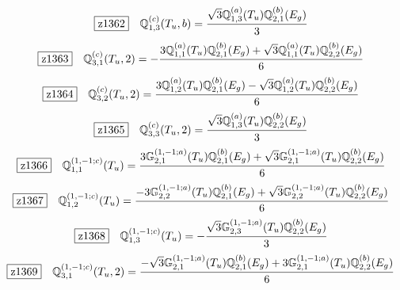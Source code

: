 \documentclass[fleqn,10pt,landscape]{jsarticle}
\begin{document}
\begin{dmath*}
\hspace*{3mm}\fbox{z1362}\quad \mathbb{Q}_{1,3}^{(c)}(T_{u},b)=\frac{\sqrt{3} \mathbb{Q}_{1,3}^{(a)}(T_{u}) \mathbb{Q}_{2,1}^{(b)}(E_{g})}{3}
\end{dmath*}
\begin{dmath*}
\hspace*{3mm}\fbox{z1363}\quad \mathbb{Q}_{3,1}^{(c)}(T_{u},2)=- \frac{3 \mathbb{Q}_{1,1}^{(a)}(T_{u}) \mathbb{Q}_{2,1}^{(b)}(E_{g}) + \sqrt{3} \mathbb{Q}_{1,1}^{(a)}(T_{u}) \mathbb{Q}_{2,2}^{(b)}(E_{g})}{6}
\end{dmath*}
\begin{dmath*}
\hspace*{3mm}\fbox{z1364}\quad \mathbb{Q}_{3,2}^{(c)}(T_{u},2)=\frac{3 \mathbb{Q}_{1,2}^{(a)}(T_{u}) \mathbb{Q}_{2,1}^{(b)}(E_{g}) - \sqrt{3} \mathbb{Q}_{1,2}^{(a)}(T_{u}) \mathbb{Q}_{2,2}^{(b)}(E_{g})}{6}
\end{dmath*}
\begin{dmath*}
\hspace*{3mm}\fbox{z1365}\quad \mathbb{Q}_{3,3}^{(c)}(T_{u},2)=\frac{\sqrt{3} \mathbb{Q}_{1,3}^{(a)}(T_{u}) \mathbb{Q}_{2,2}^{(b)}(E_{g})}{3}
\end{dmath*}
\begin{dmath*}
\hspace*{3mm}\fbox{z1366}\quad \mathbb{Q}_{1,1}^{(1,-1;c)}(T_{u})=\frac{3 \mathbb{G}_{2,1}^{(1,-1;a)}(T_{u}) \mathbb{Q}_{2,1}^{(b)}(E_{g}) + \sqrt{3} \mathbb{G}_{2,1}^{(1,-1;a)}(T_{u}) \mathbb{Q}_{2,2}^{(b)}(E_{g})}{6}
\end{dmath*}
\begin{dmath*}
\hspace*{3mm}\fbox{z1367}\quad \mathbb{Q}_{1,2}^{(1,-1;c)}(T_{u})=\frac{- 3 \mathbb{G}_{2,2}^{(1,-1;a)}(T_{u}) \mathbb{Q}_{2,1}^{(b)}(E_{g}) + \sqrt{3} \mathbb{G}_{2,2}^{(1,-1;a)}(T_{u}) \mathbb{Q}_{2,2}^{(b)}(E_{g})}{6}
\end{dmath*}
\begin{dmath*}
\hspace*{3mm}\fbox{z1368}\quad \mathbb{Q}_{1,3}^{(1,-1;c)}(T_{u})=- \frac{\sqrt{3} \mathbb{G}_{2,3}^{(1,-1;a)}(T_{u}) \mathbb{Q}_{2,2}^{(b)}(E_{g})}{3}
\end{dmath*}
\begin{dmath*}
\hspace*{3mm}\fbox{z1369}\quad \mathbb{Q}_{3,1}^{(1,-1;c)}(T_{u},2)=\frac{- \sqrt{3} \mathbb{G}_{2,1}^{(1,-1;a)}(T_{u}) \mathbb{Q}_{2,1}^{(b)}(E_{g}) + 3 \mathbb{G}_{2,1}^{(1,-1;a)}(T_{u}) \mathbb{Q}_{2,2}^{(b)}(E_{g})}{6}
\end{dmath*}
\end{document}
